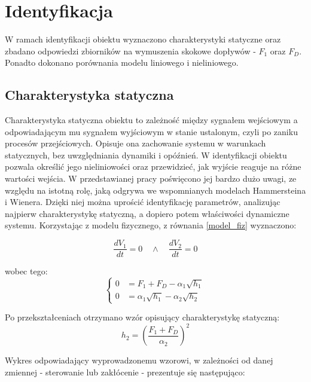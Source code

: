 \section{Identyfikacja}

W ramach identyfikacji obiektu wyznaczono charakterystyki statyczne oraz zbadano odpowiedzi zbiorników na wymuszenia skokowe dopływów - $F_1$ oraz $F_D$. Ponadto dokonano porównania modelu liniowego i nieliniowego.

\subsection{Charakterystyka statyczna}
Charakterystyka statyczna obiektu to zależność między sygnałem wejściowym a odpowiadającym mu sygnałem wyjściowym w stanie ustalonym, czyli po zaniku procesów przejściowych. Opisuje ona zachowanie systemu w warunkach statycznych, bez uwzględniania dynamiki i opóźnień. W identyfikacji obiektu pozwala określić jego nieliniowości oraz przewidzieć, jak wyjście reaguje na różne wartości wejścia. W przedstawianej pracy poświęcono jej bardzo dużo uwagi, ze względu na istotną rolę, jaką odgrywa we wspomnianych modelach Hammersteina i Wienera. Dzięki niej można uprościć identyfikację parametrów, analizując najpierw charakterystykę statyczną, a dopiero potem właściwości dynamiczne systemu. Korzystając z modelu fizycznego, z równania \ref{model_fiz} wyznaczono:

\begin{equation}
\frac{dV_1}{dt} = 0 \quad \wedge \quad \frac{dV_2}{dt} = 0
\end{equation}

\noindent wobec tego:
\begin{equation}
\begin{cases}
0 &= F_1 + F_D - \alpha_1 \sqrt{h_1} \\[10pt]
0 &= \alpha_1 \sqrt{h_1} - \alpha_2 \sqrt{h_2}
\end{cases}
\end{equation}

\noindent Po przekształceniach otrzymano wzór opisujący charakterystykę statyczną:
\begin{equation}
h_2 = \left( \frac{F_1 + F_D}{\alpha_2} \right)^2
\end{equation}

\noindent Wykres odpowiadający wyprowadzonemu wzorowi, w zależności od danej zmiennej - sterowanie lub zakłócenie - prezentuje się następująco:

